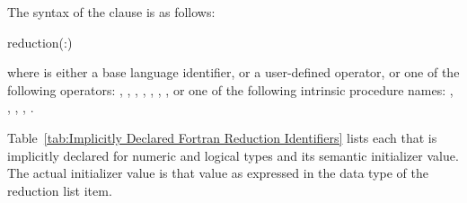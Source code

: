 {{{{\ccppspecificend %
\bigskip

\fortranspecificstart
The syntax of the  clause is as follows:

\begin{boxedcode}
reduction(:)
\end{boxedcode}

where  is either a base language identifier, or a user-defined operator, 
or one of the following operators: 
\code{+}, 
\code{-}, 
\code{*}, 
, 
, 
, 
, 
 or one of the following intrinsic procedure names: 
, 
, 
, 
, 
. 

Table~\ref{tab:Implicitly Declared Fortran Reduction Identifiers} lists each  that is implicitly declared for numeric 
and logical types and its semantic initializer value. The actual initializer value is that 
value as expressed in the data type of the reduction list item.

}}}}
